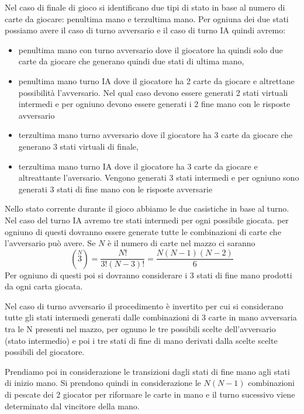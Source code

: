 \documentclass[a4paper,11pt]{article}
\begin{document}
Nel caso di finale  di gioco si identificano due tipi di stato in base al numero
di carte da giocare: penultima mano e terzultima mano.
Per ogniuna dei due stati possiamo avere il caso di turno avversario e il caso di turno IA
quindi avremo:
\begin{itemize}
\item
penultima mano con turno avversario dove il giocatore ha quindi solo due carte da giocare
che generano quindi due stati di ultima mano,
\item
penultima mano turno IA dove il giocatore ha 2 carte da giocare e altrettane possibilità l'avversario.
Nel qual caso devono essere generati 2 stati virtuali intermedi e per ogniuno devono essere generati
i 2 fine mano con le risposte avversario
\item
terzultima mano turno avversario dove il giocatore ha 3 carte da giocare che generano 3 stati
virtuali di finale,
\item
terzultima mano turno IA dove il giocatore ha 3 carte da giocare e altreattante l'aversario.
Vengono generati 3 stati intermedi e per ogniuno sono generati 3 stati di fine mano con
le risposte avversarie
\end{itemize}

Nello stato corrente  durante il gioco abbiamo le due casistiche
in base al turno.
Nel caso del turno IA avremo tre stati intermedi per ogni possibile giocata. per ogniuno
di questi dovranno essere generate tutte le combinazioni di carte che l'avversario può avere.
Se $ N $ è il numero di carte nel mazzo ci saranno 
\[
\left( \stackrel{N}{3} \right)  = \frac{N!}{3! (N - 3)! } = \frac{N (N - 1) (N - 2)}{6}
\]
Per ogniuno di questi poi si dovranno considerare i 3 stati di fine mano prodotti da ogni carta
giocata.

Nel caso di turno avversario il procedimento è invertito per cui si considerano tutte gli stati
intermedi generati dalle combinazioni di 3 carte in mano avversaria tra le N presenti nel mazzo,
per ognuno le tre possibili scelte dell'avversario (stato intermedio) e poi i tre stati di fine di
mano derivati dalla scelte scelte possibili del giocatore.

Prendiamo poi in considerazione le transizioni dagli stati di fine mano 
agli stati di inizio mano.
Si prendono quindi in considerazione le $ N (N-1) $ combinazioni di pescate dei 2 giocator
per riformare le carte in mano e il turno sucessivo viene determinato dal vincitore della mano.
\end{document}
